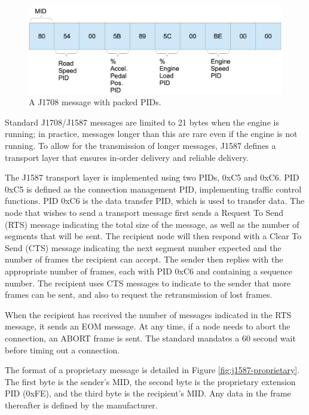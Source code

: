 \begin{figure}[h]
  \center
  \includegraphics[scale=0.6]{PackedPIDs}
  \caption{A J1708 message with packed PIDs.}
  \label{fig:packedpids}
\end{figure}


Standard J1708/J1587 messages are limited to 21 bytes when the engine is running; in practice, messages longer than this are rare even if the engine
is not running. To allow for the transmission of longer messages, J1587 defines a transport layer that ensures in-order delivery and reliable delivery.

The J1587 transport layer is implemented using two PIDs, 0xC5 and 0xC6. PID 0xC5 is defined as the connection management PID, implementing traffic control
functions. PID 0xC6 is the data transfer PID, which is used to transfer data. The node that wishes to send a transport message first sends a Request To Send
(RTS) message indicating the total size of the message, as well as the number of segments that will be sent. The recipient node will then respond with a 
Clear To Send (CTS) message indicating the next segment number expected and the number of frames the recipient can accept. The sender then replies with
the appropriate number of frames, each with PID 0xC6 and containing a sequence number. The recipient uses CTS messages to indicate to the sender that
more frames can be sent, and also to request the retransmission of lost frames.

When the recipient has received the number of messages indicated in the RTS message, it sends an EOM message. At any time, if a node needs to abort the
connection, an ABORT frame is sent. The standard mandates a 60 second wait before timing out a connection.

The format of a proprietary message is detailed in Figure \ref{fig:j1587-proprietary}. The first byte is the sender's MID, the second byte is the
proprietary extension PID (0xFE), and the third byte is the recipient's MID. Any data in the frame thereafter is defined by the manufacturer.

